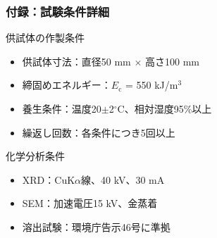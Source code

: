 \documentclass[unicode, 9pt, aspectratio=43]{beamer}
\begin{document}
\begin{frame}
  \frametitle{付録：試験条件詳細}
  \begin{block}{供試体の作製条件}
    \begin{itemize}
      \item 供試体寸法：直径50 mm \(\times \) 高さ100 mm
      \item 締固めエネルギー：\(E_{\mathrm{c}}\) = 550 kJ/m\(^3\)
      \item 養生条件：温度20\(\pm \)2\(^\circ \)C、相対湿度95\%以上
      \item 繰返し回数：各条件につき5回以上
    \end{itemize}
  \end{block}

  \begin{block}{化学分析条件}
    \begin{itemize}
      \item XRD：CuK\(\alpha \)線、40 kV、30 mA
      \item SEM：加速電圧15 kV、金蒸着
      \item 溶出試験：環境庁告示46号に準拠
    \end{itemize}
  \end{block}
\end{frame}
\end{document}
